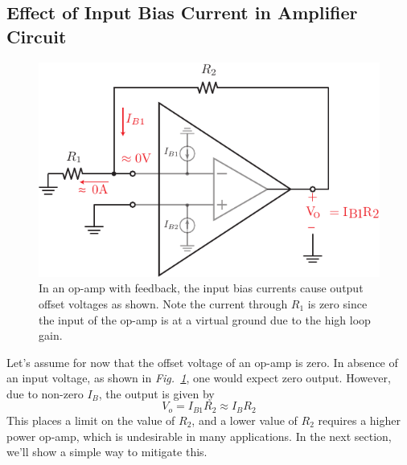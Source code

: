 \subsection{Effect of Input Bias Current in Amplifier Circuit}
\begin{figure}[tb]
\centering
\includegraphics[scale=1]{opamp_offset_i2v}
\caption{In an op-amp with feedback, the input bias currents cause output offset voltages as shown.  Note the current through $R_1$ is zero since the input of the op-amp is at a virtual ground due to the high loop gain.}
\label{fig:opamp_offset_i2v}
\end{figure}
Let's assume for now that the offset voltage of an op-amp is zero.  In absence of an input voltage, as shown in \emph{Fig.~\ref{fig:opamp_offset_i2v}}, one would expect zero output.  However, due to non-zero $I_B$, the output is given by
\begin{equation}
      V_o = I_{B1} R_2 \approx I_B R_2 
      \label{eq:off1}
\end{equation}
This places a limit on the value of $R_2$, and a lower value of $R_2$ requires a higher power op-amp, which is undesirable in many applications.  In the next section, we'll show a simple way to mitigate this.
